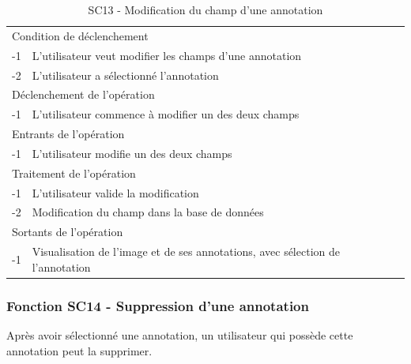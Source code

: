 \documentclass[a4paper]{article}
\begin{document}
\begin{table}[H]
  \centering
   \small
	\begin{tabular}{|c|p{12cm}|}
   		\hline
   			\rowcolor{lightgray}\multicolumn{2}{|c|}{\textbf{SC13 - Modification du champ d’une annotation}} \\
   		\hline
   			\multicolumn{2}{|l|}{Condition de d\'eclenchement} \\
   		\hline
   			-1 & L’utilisateur veut modifier les champs d’une annotation\\
			-2 & L’utilisateur a sélectionné l’annotation\\
   		\hline
   			\multicolumn{2}{|l|}{D\'eclenchement de l'op\'eration} \\
   		\hline
   			-1 & L’utilisateur commence à modifier un des deux champs\\
   		\hline
   			\multicolumn{2}{|l|}{Entrants de l'op\'eration} \\
   		\hline
   			-1 & L’utilisateur modifie un des deux champs\\
   		\hline
   			\multicolumn{2}{|l|}{Traitement de l'op\'eration} \\
  		\hline
   			-1 & L’utilisateur valide la modification\\
            -2 & Modification du champ dans la base de données\\
   		\hline
   			\multicolumn{2}{|l|}{Sortants de l'op\'eration} \\
   		\hline
   			-1 & Visualisation de l’image et de ses annotations, avec sélection de l’annotation\\
   		\hline
	\end{tabular}
  \caption{SC13 - Modification du champ d’une annotation}
  \normalsize
  \label{tab:modification_champ_annotation}
\end{table}

\subsubsection{Fonction SC14 - Suppression d'une annotation}
Après avoir sélectionné une annotation, un utilisateur qui possède cette annotation peut la supprimer.\\
\end{document}
